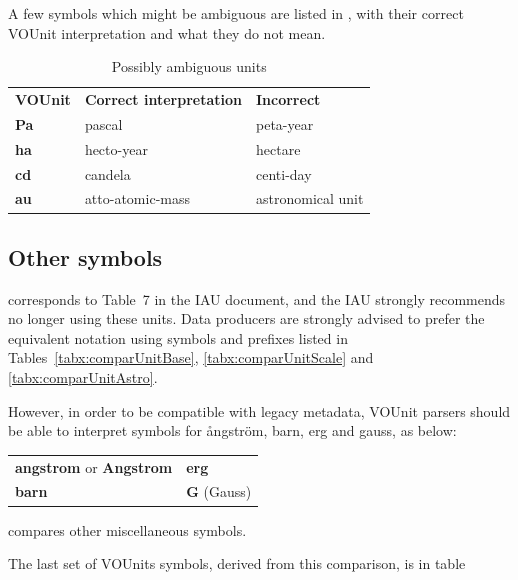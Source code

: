 \documentclass[11pt,notitlepage,onecolumn]{ivoa}
\newcommand{\unit}[1]{\textbf{\textsf{\color{orange}#1}}}
\begin{document}
A few symbols which might be ambiguous are listed in , with their correct 
VOUnit interpretation and what they do not mean.


\begin{table}[bht]
\begin{center}
\begin{tabular}{lll}
\textbf{VOUnit}&\textbf{Correct interpretation}&\textbf{Incorrect}\\
\unit{Pa}&pascal&peta-year\\
\unit{ha}&hecto-year&hectare\\
\unit{cd}&candela&centi-day\\
\unit{au}&atto-atomic-mass&astronomical unit\\
\end{tabular}
\end{center}
\caption{\label{tab:ambiguous}Possibly ambiguous units}
\end{table}

\subsection{Other symbols}

 corresponds to Table~7 in the IAU document, and the IAU strongly
recommends no longer using these units. 
Data producers are strongly advised to prefer the equivalent notation using symbols and prefixes listed in 
Tables~\ref{tabx:comparUnitBase}, \ref{tabx:comparUnitScale} and \ref{tabx:comparUnitAstro}. 

However, in order to be compatible with legacy metadata, VOUnit parsers should be able to interpret
symbols for \aa{}ngstr\"om, barn, erg and gauss, as below:

\medskip

\begin{tabular}{|l|l|}\hline
\unit{angstrom} or \unit{Angstrom} 	&\unit{erg}    	\\
\unit{barn}		&\unit{G} (Gauss)    		\\\hline
\end{tabular}

\medskip

 compares other miscellaneous symbols. 

The last set of VOUnits symbols, derived from this comparison, is in
table 
\end{document}
